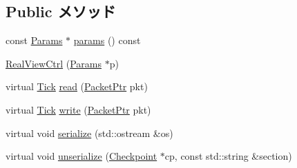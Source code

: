 \subsection*{Public メソッド}
\begin{DoxyCompactItemize}
\item 
const \hyperlink{classRealViewCtrl_a7bb0551c15e75a5df04d65454bcb45dc}{Params} $\ast$ \hyperlink{classRealViewCtrl_acd3c3feb78ae7a8f88fe0f110a718dff}{params} () const 
\item 
\hyperlink{classRealViewCtrl_a235c06ddf63669981becb52918686cb6}{RealViewCtrl} (\hyperlink{classRealViewCtrl_a7bb0551c15e75a5df04d65454bcb45dc}{Params} $\ast$p)
\item 
virtual \hyperlink{base_2types_8hh_a5c8ed81b7d238c9083e1037ba6d61643}{Tick} \hyperlink{classRealViewCtrl_a613ec7d5e1ec64f8d21fec78ae8e568e}{read} (\hyperlink{classPacket}{PacketPtr} pkt)
\item 
virtual \hyperlink{base_2types_8hh_a5c8ed81b7d238c9083e1037ba6d61643}{Tick} \hyperlink{classRealViewCtrl_a4cefab464e72b5dd42c003a0a4341802}{write} (\hyperlink{classPacket}{PacketPtr} pkt)
\item 
virtual void \hyperlink{classRealViewCtrl_a53e036786d17361be4c7320d39c99b84}{serialize} (std::ostream \&os)
\item 
virtual void \hyperlink{classRealViewCtrl_af22e5d6d660b97db37003ac61ac4ee49}{unserialize} (\hyperlink{classCheckpoint}{Checkpoint} $\ast$cp, const std::string \&section)
\end{DoxyCompactItemize}
